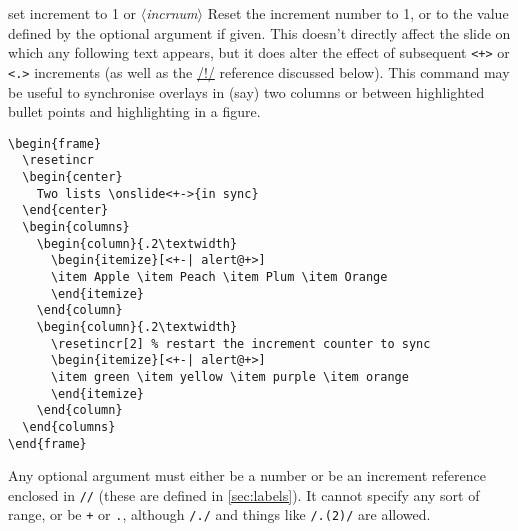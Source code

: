\documentclass[a4paper]{ltxdoc}
\makeatletter
\def\meta#1{$\langle${\rmfamily\itshape#1}$\rangle$}
\def\cmdlink#1#2{%
  \hyperlink{\csuse{@bookmark@#1}}{#2}%
}
\makeatother
\begin{document}
\begin{command}{\resetincr{}}%
  {set increment to 1 or \meta{incrnum}}%
  Reset the increment number to 1, or to the value defined by the optional
  argument if given.  This doesn't directly affect the slide on which any
  following text appears, but it does alter the effect of subsequent
  \texttt{<+>} or \texttt{<.>} increments (as well as the
  \cmdlink{/!/}{/!/} reference discussed below).  This command may be
  useful to synchronise overlays in (say) two columns or between highlighted
  bullet points and highlighting in a figure.  \example
\begin{verbatim}
\begin{frame}
  \resetincr
  \begin{center}
    Two lists \onslide<+->{in sync}
  \end{center}
  \begin{columns}
    \begin{column}{.2\textwidth}
      \begin{itemize}[<+-| alert@+>]
      \item Apple \item Peach \item Plum \item Orange
      \end{itemize}
    \end{column}
    \begin{column}{.2\textwidth}
      \resetincr[2] % restart the increment counter to sync
      \begin{itemize}[<+-| alert@+>]
      \item green \item yellow \item purple \item orange
      \end{itemize}
    \end{column}
  \end{columns}
\end{frame}
\end{verbatim}
Any optional argument must either be a number or be an increment reference
enclosed in \texttt{//} (these are defined in \cref{sec:labels}).  It cannot
specify any sort of range, or be \texttt+ or \texttt., although \texttt{/./} and
things like \texttt{/.(2)/} are allowed.


\end{command}
\end{document}
